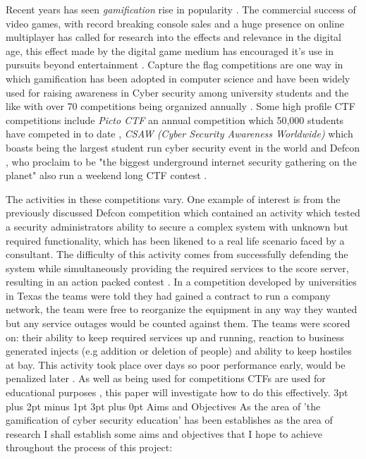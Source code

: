 \documentclass[12pt,a4paper]{article}
\makeatletter
\renewcommand\subsection{\@startsection {subsection}{1}{2mm} %
                               {3pt plus 2pt minus 1pt} %
                               {3pt plus 0pt} %
                               {\normalfont\bfseries}}
\makeatother
\begin{document}
Recent years has seen \emph{gamification} rise in popularity \cite{deterding2011game}. The commercial success of video games, with record breaking console sales and a huge presence on online multiplayer has called for research into the effects and relevance in the digital age, this effect made by the digital game medium has encouraged it's use in pursuits beyond entertainment \cite{seaborn2015gamification}. Capture the flag competitions are one way in which gamification has been adopted in computer science and have been widely used for raising awareness in Cyber security among university students and the like \cite{ford2017capture} with over 70 competitions being organized annually \cite{katsantonis2017conceptual1}. Some high profile CTF competitions include \emph{Picto CTF} \cite{pictoctf} an annual competition which 50,000 students have competed in to date \cite{pictoctfstat}, \emph{CSAW (Cyber Security Awareness Worldwide)} which boasts being the largest student run cyber security event in the world \cite{csaw} and Defcon \cite{defcon}, who proclaim to be "the biggest underground internet security gathering on the planet" also run a weekend long CTF contest \cite{cowan2003defcon}.  


The activities in these competitions vary. One example of interest is from the previously discussed Defcon competition which contained an activity which tested a security administrators ability to secure a complex system with unknown but required functionality, which has been likened to a real life scenario faced by a consultant. The difficulty of this activity comes from successfully defending the system while simultaneously providing the required services to the score server, resulting in an action packed contest \cite{cowan2003defcon}. In a competition developed by universities in Texas the teams were told they had gained a contract to run a company network, the team were free to reorganize the equipment in any way they wanted but any service outages would be counted against them. The teams were scored on: their ability to keep  required services up and running, reaction to business generated injects (e.g addition or deletion of people) and ability to keep hostiles at bay. This activity took place over days so poor performance early, would be penalized later \cite{conklin2006cyber}. As well as being used for competitions CTFs are used for educational purposes \cite{noor2018usability}, this paper will investigate how to do this effectively.
\subsection{Aims and Objectives} 
As the area of 'the gamification of cyber security education' has been establishes as the area of research I shall establish some aims and objectives that I hope to achieve throughout the process of this project:  
\end{document}
